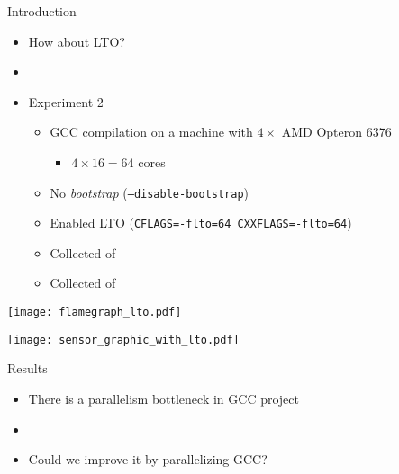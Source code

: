 \begin{frame}{Introduction}
    \begin{itemize}
        \item How about LTO?
        \item[]
        \item Experiment 2
        \begin{itemize}
            \item GCC compilation on a machine with $4\times$ AMD Opteron 6376
                \begin{itemize}
                    \item $4 \times 16 = 64$ cores
                \end{itemize}
            \item No \textit{bootstrap} (\texttt{--disable-bootstrap})
            \item Enabled LTO (\texttt{CFLAGS=-flto=64 CXXFLAGS=-flto=64})
            \item Collected {\color{blue}{Compilation Time}} of {\color{red}{each file}}
            \item Collected {\color{blue}{Consumed Energy}} of {\color{red}{all CPUs}}
        \end{itemize}
    \end{itemize}
\end{frame}

\begin{frame}
    \texttt{[image: flamegraph\_lto.pdf]}
    \label{fig:analysis_lto}
\end{frame}

\begin{frame}
    \centering
    \texttt{[image: sensor\_graphic\_with\_lto.pdf]}
    \label{fig:sensor_graphic_lto}
\end{frame}


\begin{frame}{Results}
    \begin{itemize}
        \item There is a parallelism bottleneck in GCC project
        \item[]
        \item Could we improve it by parallelizing GCC?
    \end{itemize}
\end{frame}

